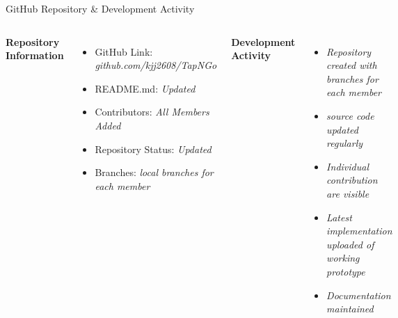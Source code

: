 \documentclass[aspectratio=169,11pt]{beamer}
\newcommand{\smallnote}[1]{%
\vspace{0.08cm}
{\scriptsize\color{GEUGrey}#1}
}
\newcommand{\placeholder}[1]{%
\textit{\color{GEUGrey}#1}
}
\begin{document}
\begin{frame}{GitHub Repository \& Development Activity}

\begin{columns}[T,totalwidth=\textwidth]


\textbf{\color{GEUBlue}Repository Information}

\begin{itemize}\itemsep3pt
\item GitHub Link: \placeholder{github.com/kjj2608/TapNGo}
\item README.md: \placeholder{Updated}
\item Contributors: \placeholder{All Members Added}
\item Repository Status: \placeholder{Updated}
\item Branches: \placeholder{local branches for each member}
\end{itemize}


\textbf{\color{GEUBlue}Development Activity}

\begin{itemize}\itemsep3pt
\item \placeholder{Repository created with branches for each member}
\item \placeholder{source code updated regularly}
\item \placeholder{Individual contribution are visible}
\item \placeholder{Latest implementation uploaded of working prototype}
\item \placeholder{Documentation maintained}
\end{itemize}

\end{columns}

\vfill



\end{frame}
\end{document}
